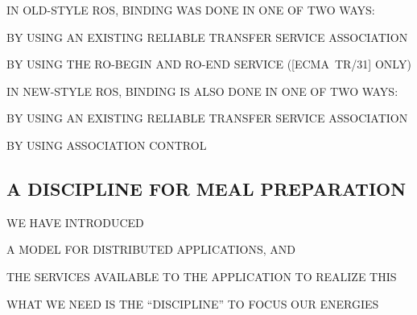 \begin{bwslide}

\begin{nrtc}
\item	IN OLD-STYLE ROS, BINDING WAS DONE IN ONE OF TWO WAYS:
    \begin{nrtc}
    \item	BY USING AN EXISTING RELIABLE TRANSFER SERVICE ASSOCIATION

    \item	BY USING THE RO-BEGIN AND RO-END SERVICE ([ECMA~TR/31] ONLY)
    \end{nrtc}
\end{nrtc}
\end{bwslide}




\begin{bwslide}

\begin{nrtc}
\item	IN NEW-STYLE ROS, BINDING IS ALSO DONE IN ONE OF TWO WAYS:
    \begin{nrtc}
    \item	BY USING AN EXISTING RELIABLE TRANSFER SERVICE ASSOCIATION

    \item	BY USING ASSOCIATION CONTROL
    \end{nrtc}
\end{nrtc}
\end{bwslide}




\begin{bwslide}
\part*	{A DISCIPLINE FOR MEAL PREPARATION}\bf

\begin{nrtc}
\item	WE HAVE INTRODUCED
    \begin{nrtc}
    \item	A MODEL FOR DISTRIBUTED APPLICATIONS, AND

    \item	THE SERVICES AVAILABLE TO THE APPLICATION TO REALIZE THIS
    \end{nrtc}

\item	WHAT WE NEED IS THE ``DISCIPLINE'' TO FOCUS OUR ENERGIES
\end{nrtc}
\end{bwslide}


